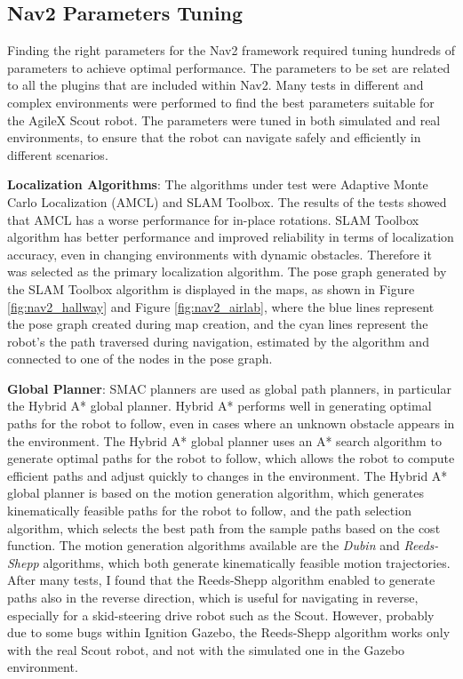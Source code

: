 \subsection{Nav2 Parameters Tuning}

Finding the right parameters for the Nav2 framework required tuning hundreds of parameters to achieve optimal performance.
The parameters to be set are related to all the plugins that are included within Nav2. 
Many tests in different and complex environments were performed to find the best parameters
suitable for the AgileX Scout robot. The parameters were tuned in both simulated
and real environments, to ensure that the robot can navigate safely and efficiently in different scenarios.

\textbf{Localization Algorithms}:
The algorithms under test were Adaptive Monte Carlo Localization (AMCL) and SLAM Toolbox.
The results of the tests showed that AMCL has a worse performance for in-place rotations.
SLAM Toolbox algorithm has better performance and improved reliability in terms of localization accuracy,
even in changing environments with dynamic obstacles. Therefore it was selected as the primary localization algorithm.
The pose graph generated by the SLAM Toolbox algorithm
is displayed in the maps, as shown in Figure \ref{fig:nav2_hallway} and Figure \ref{fig:nav2_airlab}, where the
blue lines represent the pose graph created during map creation, and the cyan lines represent the robot's
the path traversed during navigation, estimated by the algorithm and connected to one of the nodes in the pose graph.

\textbf{Global Planner}:
SMAC planners \cite{macenski2024smac} are used as global path planners, in particular the Hybrid A* global planner.
Hybrid A* performs well in generating optimal paths for the robot to follow, 
even in cases where an unknown obstacle appears in the environment. The Hybrid A*
global planner uses an A* search algorithm to generate optimal paths for the robot to follow, which allows the robot
to compute efficient paths and adjust quickly to changes in the environment. The Hybrid A* global planner is based on
the motion generation algorithm, which generates kinematically feasible paths for the robot to follow, and the path selection
algorithm, which selects the best path from the sample paths based on the cost function.
The motion generation algorithms available are the \textit{Dubin} and \textit{Reeds-Shepp} algorithms, which both generate
kinematically feasible motion trajectories. After many tests, I found that the Reeds-Shepp algorithm enabled
to generate paths also in the reverse direction, which is useful for navigating in reverse, especially for
a skid-steering drive robot such as the Scout. However, probably due to some bugs within Ignition Gazebo,
the Reeds-Shepp algorithm works only with the real Scout robot, and not with the simulated one in the Gazebo environment.

